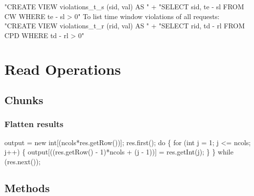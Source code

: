 "CREATE VIEW violations_t_s (sid, val) AS "
  + "SELECT sid, te - sl FROM CW WHERE te - sl > 0"
\nwendcode{}\nwdocspar
To list time window violations of all requests:
\nwenddocs{}\endmoddef{}
"CREATE VIEW violations_t_r (rid, val) AS "
  + "SELECT rid, td - rl FROM CPD WHERE td - rl > 0"
\nwendcode{}\nwdocspar
\nwenddocs{}\chapter{Read Operations}
\label{read}

\section{Chunks}

\subsection{Flatten results}
\nwenddocs{}\endmoddef{}
output = new int[(ncols*res.getRow())];
res.first();
do \{
  for (int j = 1; j <= ncols; j++) \{
    output[((res.getRow() - 1)*ncols + (j - 1))] = res.getInt(j);
  \}
\} while (res.next());
\nwendcode{}\nwdocspar

\section{Methods}

